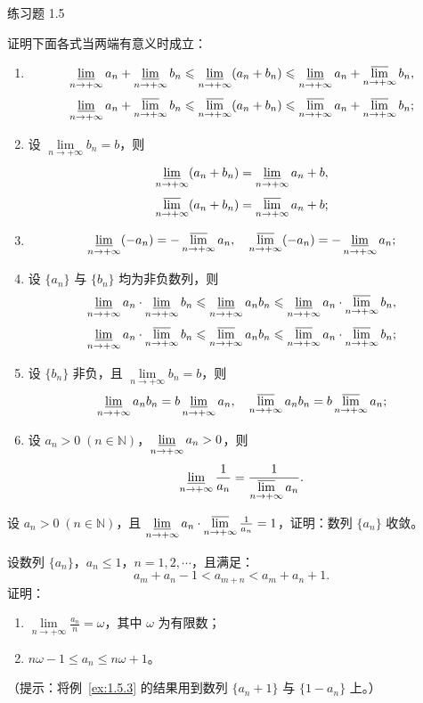 \begin{exblock}{练习题 1.5}
    \item 证明下面各式当两端有意义时成立：
    \begin{enumerate}
        \item 
        \[
        \varliminf_{n\to+\infty} a_n + \varliminf_{n\to+\infty} b_n \leqslant \varliminf_{n\to+\infty} (a_n + b_n) \leqslant \varliminf_{n\to+\infty} a_n + \varlimsup_{n\to+\infty} b_n,
\]
        \[
        \varliminf_{n\to+\infty} a_n + \varlimsup_{n\to+\infty} b_n \leqslant \varlimsup_{n\to+\infty} (a_n + b_n) \leqslant \varlimsup_{n\to+\infty} a_n + \varlimsup_{n\to+\infty} b_n;
\]
        \item 设 $\lim\limits_{n\to+\infty} b_n = b$，则
        \[
        \varliminf_{n\to+\infty} (a_n + b_n) = \varliminf_{n\to+\infty} a_n + b,
\]
        \[
        \varlimsup_{n\to+\infty} (a_n + b_n) = \varlimsup_{n\to+\infty} a_n + b;
\]
        \item 
        \[
        \varliminf_{n\to+\infty} (-a_n) = -\varlimsup_{n\to+\infty} a_n,\quad \varlimsup_{n\to+\infty} (-a_n) = -\varliminf_{n\to+\infty} a_n;
\]
        \item 设 $\{a_n\}$ 与 $\{b_n\}$ 均为非负数列，则
        \[
        \varliminf_{n\to+\infty} a_n \cdot \varliminf_{n\to+\infty} b_n \leqslant \varliminf_{n\to+\infty} a_n b_n \leqslant \varliminf_{n\to+\infty} a_n \cdot \varlimsup_{n\to+\infty} b_n,
\]
        \[
        \varliminf_{n\to+\infty} a_n \cdot \varlimsup_{n\to+\infty} b_n \leqslant \varlimsup_{n\to+\infty} a_n b_n \leqslant \varlimsup_{n\to+\infty} a_n \cdot \varlimsup_{n\to+\infty} b_n;
\]
        \item 设 $\{b_n\}$ 非负，且 $\lim\limits_{n\to+\infty} b_n = b$，则
        \[
        \varliminf_{n\to+\infty} a_n b_n = b \varliminf_{n\to+\infty} a_n,\quad \varlimsup_{n\to+\infty} a_n b_n = b \varlimsup_{n\to+\infty} a_n;
\]
        \item 设 $a_n > 0\;(n \in \mathbb{N})$，$\varliminf\limits_{n\to+\infty} a_n > 0$，则
        \[
        \varliminf_{n\to+\infty} \frac{1}{a_n} = \frac{1}{\varlimsup\limits_{n\to+\infty} a_n}.
\]
    \end{enumerate}

    \item 设 $a_n > 0\;(n \in \mathbb{N})$，且 $\varliminf\limits_{n\to+\infty} a_n \cdot \varlimsup\limits_{n\to+\infty} \frac{1}{a_n} = 1$，证明：数列 $\{a_n\}$ 收敛。

    \item 设数列 $\{a_n\}$，$a_n \leqslant 1$，$n = 1, 2, \cdots$，且满足：
    \[
    a_m + a_n - 1 < a_{m+n} < a_m + a_n + 1.
\]
    证明：
    \begin{enumerate}
        \item $\lim\limits_{n\to+\infty} \frac{a_n}{n} = \omega$，其中 $\omega$ 为有限数；
        \item $n\omega - 1 \leqslant a_n \leqslant n\omega + 1$。
    \end{enumerate}
    （提示：将例~\ref{ex:1.5.3} 的结果用到数列 $\{a_n + 1\}$ 与 $\{1 - a_n\}$ 上。）


\end{exblock}
